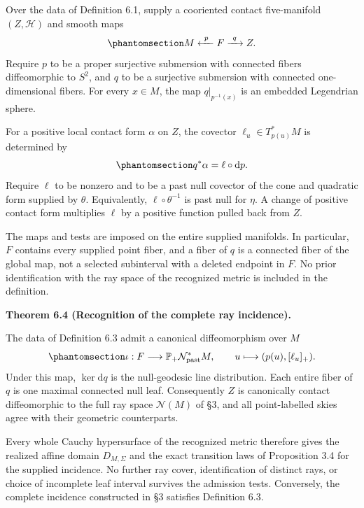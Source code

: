 \documentclass[
  english,
  11pt,
  reqno]{amsart}
\makeatletter
\newcommand{\pandocstatementheading}[1]{%
  \par\if@nobreak\else
    \addpenalty{\@beginparpenalty}%
    \addvspace{.5\baselineskip plus .2\baselineskip minus .2\baselineskip}%
  \fi
  {\normalfont\bfseries #1\par}%
  \nobreak\@afterindenttrue\@afterheading
}
\makeatother
\begin{document}
Over the data of Definition 6.1, supply a cooriented contact
five-manifold \((Z,\mathcal H)\) and smooth maps
\begin{equation}\protect\phantomsection\label{eq:global-admitted-double-fibration}{
M\xleftarrow{\ p\ }F\xrightarrow{\ q\ }Z.
}\end{equation} Require \(p\) to be a proper surjective submersion with
connected fibers diffeomorphic to \(S^2\), and \(q\) to be a surjective
submersion with connected one-dimensional fibers. For every \(x\in M\),
the map \(q|_{p^{-1}(x)}\) is an embedded Legendrian sphere.

For a positive local contact form \(\alpha\) on \(Z\), the covector
\(\ell_u\in T^*_{p(u)}M\) is determined by
\begin{equation}\protect\phantomsection\label{eq:global-admitted-contact-normal}{
q^*\alpha=\ell\circ\mathrm dp.
}\end{equation} Require \(\ell\) to be nonzero and to be a past null
covector of the cone and quadratic form supplied by \(\theta\).
Equivalently, \(\ell\circ\theta^{-1}\) is past null for \(\eta\). A
change of positive contact form multiplies \(\ell\) by a positive
function pulled back from \(Z\).

The maps and tests are imposed on the entire supplied manifolds. In
particular, \(F\) contains every supplied point fiber, and a fiber of
\(q\) is a connected fiber of the global map, not a selected subinterval
with a deleted endpoint in \(F\). No prior identification with the ray
space of the recognized metric is included in the definition.

\pandocstatementheading{\protect{}\label{thm:global-incidence-recognition}Theorem 6.4 (Recognition of the complete ray incidence).}

The data of Definition 6.3 admit a canonical diffeomorphism over \(M\)
\begin{equation}\protect\phantomsection\label{eq:global-incidence-recognition-map}{
\iota:F\longrightarrow\mathbb P_+\mathcal N^*_{\mathrm{past}}M,
\qquad
u\longmapsto(p(u),[\ell_u]_+).
}\end{equation} Under this map, \(\ker\mathrm dq\) is the null-geodesic
line distribution. Each entire fiber of \(q\) is one maximal connected
null leaf. Consequently \(Z\) is canonically contact diffeomorphic to
the full ray space \(\mathcal N(M)\) of §3, and all point-labelled skies
agree with their geometric counterparts.

Every whole Cauchy hypersurface of the recognized metric therefore gives
the realized affine domain \(D_{M,\Sigma}\) and the exact transition
laws of Proposition 3.4 for the supplied incidence. No further ray
cover, identification of distinct rays, or choice of incomplete leaf
interval survives the admission tests. Conversely, the complete
incidence constructed in §3 satisfies Definition 6.3.
\end{document}
